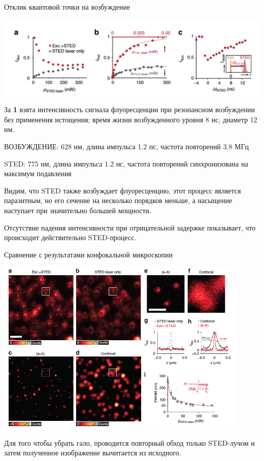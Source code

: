 \documentclass[9pt, compress, xcolor=table]{beamer}
\begin{document}
\begin{frame}{Отклик квантовой точки на возбуждение}
\begin{center}
\includegraphics[width=\textwidth]{ffm23}
\end{center}

{\small За \textbf{1} взята интенсивность сигнала флуоресценции при резонансном возбуждении без применения истощения; время жизни возбужденного уровня 8 нс, диаметр 12 нм.

ВОЗБУЖДЕНИЕ: 628 нм, длина импульса 1.2 пс, частота повторений 3.8 МГц

STED: 775 нм, длина импульса 1.2 нс, частота повторений синхронизована на максимум подавления

Видим, что STED также возбуждает флуоресценцию, этот процесс является паразитным, но его сечение на несколько порядков меньше, а насыщение наступает при значительно большей мощности.

Отсутствие падения интенсивности при отрицательной задержке показывает, что происходит действительно STED-процесс.}

\end{frame}
\begin{frame}{Сравнение с результатами конфокальной микроскопии}
\begin{center}
\includegraphics[width=0.9\textwidth]{ffm24}

Для того чтобы убрать гало, проводится повторный обход только STED-лучом и затем полученное изображение вычитается из исходного.

\end{center}
\end{frame}
\end{document}
